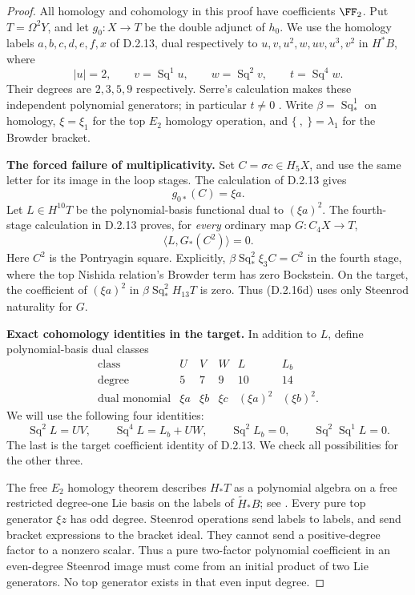 \begin{proof}
All homology and cohomology in this proof have coefficients $\FF_2$.
Put $T=\Omega^2Y$, and let $g_0:X\to T$ be the double adjunct of
$h_0$. We use the homology labels $a,b,c,d,e,f,x$ of D.2.13,
dual respectively to $u,v,u^2,w,uv,u^3,v^2$ in
$H^*B$, where
\[
 |u|=2,\qquad v=\operatorname{Sq}^1u,\qquad
 w=\operatorname{Sq}^2v,\qquad t=\operatorname{Sq}^4w.
 \tag{D.2.16b}
\]
Their degrees are $2,3,5,9$ respectively. Serre's calculation
makes these independent polynomial generators; in particular
$t\ne0$ \cite[\S2, nos.~8--9, pp.~203--204]{I_Serre1953}.
Write $\beta=\operatorname{Sq}_*^1$ on homology,
$\xi=\xi_1$ for the top $E_2$ homology operation, and
$\{\ ,\ \}=\lambda_1$ for the Browder bracket.

\medskip\noindent
\textbf{The forced failure of multiplicativity.}
Set $C=\sigma c\in H_5X$, and use the same letter for its image
in the loop stages. The calculation of D.2.13 gives
\[
 g_{0*}(C)=\xi a.
 \tag{D.2.16c}
\]
Let $L\in H^{10}T$ be the polynomial-basis functional dual to
$(\xi a)^2$. The fourth-stage calculation in D.2.13 proves, for
\emph{every} ordinary map $G:C_4X\to T$,
\[
 \langle L,G_*(C^2)\rangle=0.
 \tag{D.2.16d}
\]
Here $C^2$ is the Pontryagin square. Explicitly,
$\beta\operatorname{Sq}_*^2\xi_3C=C^2$ in the fourth stage,
where the top Nishida relation's Browder term has zero
Bockstein. On the target, the coefficient of $(\xi a)^2$ in
$\beta\operatorname{Sq}_*^2H_{13}T$ is zero. Thus
\textup{(D.2.16d)} uses only Steenrod naturality for $G$.

\medskip\noindent
\textbf{Exact cohomology identities in the target.}
In addition to $L$, define polynomial-basis dual classes
\[
\begin{array}{c|ccccc}
\text{class}&U&V&W&L&L_b\\
\text{degree}&5&7&9&10&14\\
\text{dual monomial}&\xi a&\xi b&\xi c&(\xi a)^2&(\xi b)^2.
\end{array}
 \tag{D.2.16e}
\]
We will use the following four identities:
\[
 \operatorname{Sq}^2L=UV,\qquad
 \operatorname{Sq}^4L=L_b+UW,\qquad
 \operatorname{Sq}^2L_b=0,\qquad
 \operatorname{Sq}^2\operatorname{Sq}^1L=0.
 \tag{D.2.16f}
\]
The last is the target coefficient identity of D.2.13. We check
all possibilities for the other three.

The free $E_2$ homology theorem describes $H_*T$ as a polynomial
algebra on a free restricted degree-one Lie basis on the labels
of $\widetilde H_*B$; see
\cite[Chapter III, Theorems~3.1--3.2 and Lemma~3.8]{I_CohenLadaMay1976}.
Every pure top generator $\xi z$ has odd degree. Steenrod
operations send labels to labels, and send bracket expressions
to the bracket ideal. They cannot send a positive-degree
factor to a nonzero scalar. Thus a pure two-factor polynomial
coefficient in an even-degree Steenrod image must come from an
initial product of two Lie generators. No top generator exists
in that even input degree.


\end{proof}
